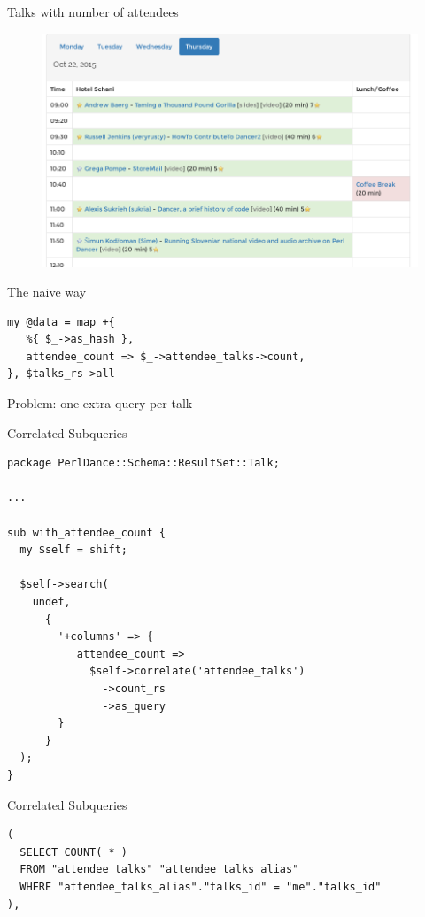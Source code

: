 \begin{frame}{Talks with number of attendees}
\begin{figure}[!ht]
\centering
\includegraphics[width=0.8\linewidth]{img/schedule2015.png}
\end{figure}
\end{frame}

\begin{frame}[fragile]{The naive way}
\begin{lstlisting}
my @data = map +{
   %{ $_->as_hash },
   attendee_count => $_->attendee_talks->count,
}, $talks_rs->all
\end{lstlisting}

Problem: one extra query per talk

\end{frame}

\begin{frame}[fragile]{Correlated Subqueries}
\begin{lstlisting}
package PerlDance::Schema::ResultSet::Talk;

...

sub with_attendee_count {
  my $self = shift;

  $self->search(
    undef,
      {
        '+columns' => {
           attendee_count =>
             $self->correlate('attendee_talks')
               ->count_rs
               ->as_query
        }
      }
  );
}
\end{lstlisting}
\end{frame}

\begin{frame}[fragile]{Correlated Subqueries}
\begin{lstlisting}
( 
  SELECT COUNT( * ) 
  FROM "attendee_talks" "attendee_talks_alias" 
  WHERE "attendee_talks_alias"."talks_id" = "me"."talks_id"
), 
\end{lstlisting}
\end{frame}

